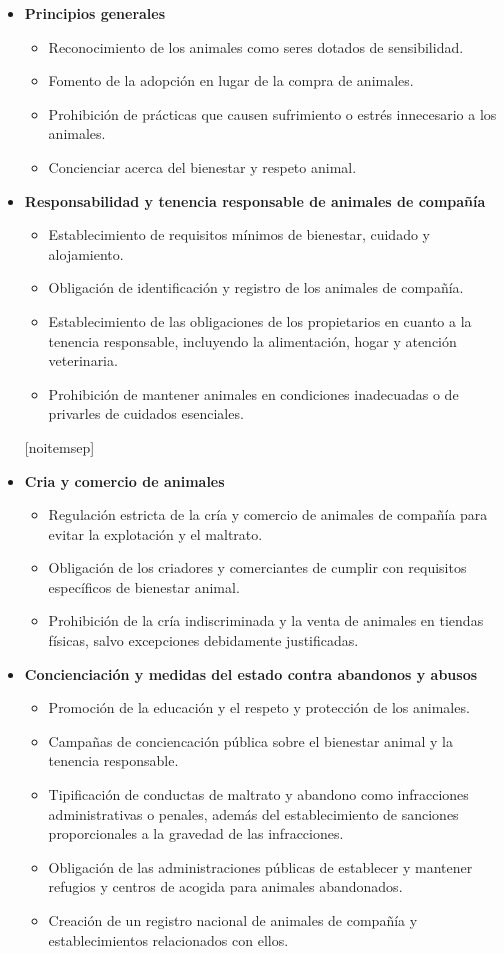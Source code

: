 \documentclass[a4paper, 12pt]{article}
\begin{document}
\begin{itemize}[noitemsep]
\item \textbf{Principios generales}
	\begin{itemize}[noitemsep]
	\item Reconocimiento de los animales como seres dotados de sensibilidad.
	\item Fomento de la adopción en lugar de la compra de animales.
	\item Prohibición de prácticas que causen sufrimiento o estrés innecesario a los animales.
	\item Concienciar acerca del bienestar y respeto animal.
	\end{itemize}
\item \textbf{Responsabilidad y tenencia responsable de animales de compañía}
	\begin{itemize}[noitemsep]
	\item Establecimiento de requisitos mínimos de bienestar, cuidado y alojamiento.
	\item Obligación de identificación y registro de los animales de compañía.
	\item Establecimiento de las obligaciones de los propietarios en cuanto a la tenencia responsable, incluyendo la alimentación, hogar y atención veterinaria.
	\item Prohibición de mantener animales en condiciones inadecuadas o de privarles de cuidados esenciales.
	\end{itemize}[noitemsep]
\item \textbf{Cria y comercio de animales}
	\begin{itemize}[noitemsep]
	\item Regulación estricta de la cría y comercio de animales de compañía para evitar la explotación y el maltrato.
	\item Obligación de los criadores y comerciantes de cumplir con requisitos específicos de bienestar animal.
	\item Prohibición de la cría indiscriminada y la venta de animales en tiendas físicas, salvo excepciones debidamente justificadas.
	\end{itemize}
\item \textbf{Concienciación y medidas del estado contra abandonos y abusos}
	\begin{itemize}[noitemsep]
	\item Promoción de la educación y el respeto y protección de los animales.
	\item Campañas de conciencación pública sobre el bienestar animal y la tenencia responsable.
	\item Tipificación de conductas de maltrato y abandono como infracciones administrativas o penales, además del establecimiento de sanciones proporcionales a la gravedad de las infracciones.
	\item Obligación de las administraciones públicas de establecer y mantener refugios y centros de acogida para animales abandonados.
	\item Creación de un registro nacional de animales de compañía y establecimientos relacionados con ellos.
	\end{itemize}
\end{itemize}
\end{document}

